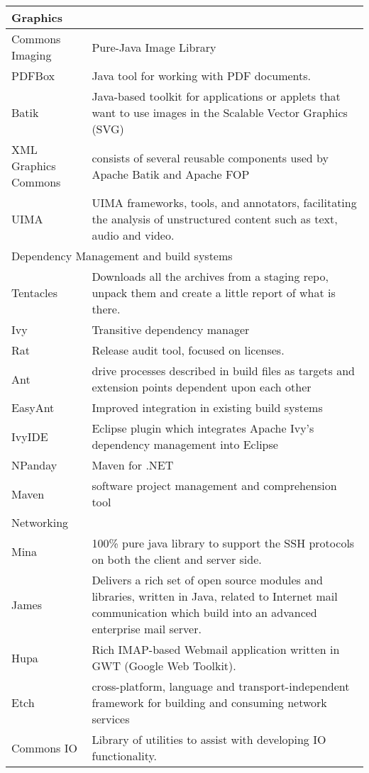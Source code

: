 {\begin{longtable}{|p{2cm} | p{14cm}|}
\hline
\multicolumn{2}{|l|}{Graphics} \\
\hline

Commons Imaging &  Pure-Java Image Library
\\ PDFBox & Java tool for working with PDF documents.
\\ Batik & Java-based toolkit for applications or applets that want to use images in the Scalable Vector Graphics (SVG)
\\ XML Graphics Commons & consists of several reusable components used by Apache Batik and Apache FOP
\\ UIMA & UIMA frameworks, tools, and annotators, facilitating the analysis of unstructured content such as text, audio and video. \\

\hline
\multicolumn{2}{|l|}{Dependency Management and build systems} \\
\hline

Tentacles & Downloads all the archives from a staging repo, unpack them and create a little report of what is there.
\\ Ivy & Transitive dependency manager
\\ Rat & Release audit tool, focused on licenses.
\\ Ant & drive processes described in build files as targets and extension points dependent upon each other
\\ EasyAnt &  Improved integration in existing build systems
\\ IvyIDE & Eclipse plugin which integrates Apache Ivy's dependency management into Eclipse
\\ NPanday & Maven for .NET
\\ Maven & software project management and comprehension tool \\

\hline
\multicolumn{2}{|l|}{Networking} \\
\hline

Mina & 100\% pure java library to support the SSH protocols on both the client and server side.
\\ James & Delivers a rich set of open source modules and libraries, written in Java, related to Internet mail communication which build into an advanced enterprise mail server.
\\ Hupa & Rich IMAP-based Webmail application written in GWT (Google Web Toolkit).
\\ Etch & cross-platform, language and transport-independent framework for building and consuming network services
\\ Commons IO &  Library of utilities to assist with developing IO functionality. \\


\end{longtable}}
